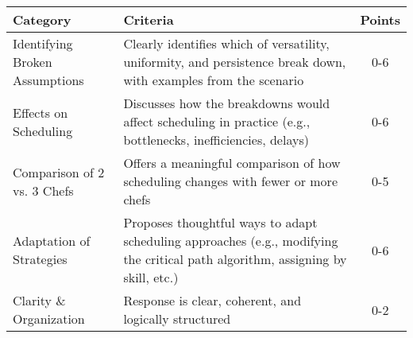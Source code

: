 \documentclass{standalone}
\begin{document}
\begin{tabular}{p{5.5cm}p{7.5cm}c}
\toprule
\textbf{Category} & \textbf{Criteria} & \textbf{Points} \\
\midrule
Identifying Broken Assumptions & Clearly identifies which of versatility, uniformity, and persistence break down, with examples from the scenario & 0-6 \\
\hline
Effects on Scheduling & Discusses how the breakdowns would affect scheduling in practice (e.g., bottlenecks, inefficiencies, delays) & 0-6 \\
\hline
Comparison of 2 vs. 3 Chefs & Offers a meaningful comparison of how scheduling changes with fewer or more chefs & 0-5 \\
\hline
Adaptation of Strategies & Proposes thoughtful ways to adapt scheduling approaches (e.g., modifying the critical path algorithm, assigning by skill, etc.) & 0-6 \\
\hline
Clarity \& Organization & Response is clear, coherent, and logically structured & 0-2 \\
\bottomrule
\end{tabular}
\end{document}
